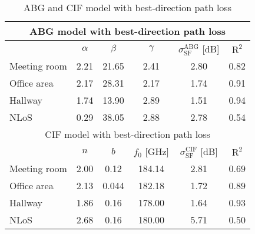 \documentclass[conference]{IEEEtran}
\begin{document}
\begin{table}[htbp]
  \centering
  \caption{ABG and CIF model with best-direction path loss}
    \begin{tabular}{|l|c|c|c|c|c|}
    \hline
    \multicolumn{6}{|c|}{ABG model with best-direction path loss}  \\
    \hline
          & \multicolumn{1}{c|}{$\alpha$} & \multicolumn{1}{c|}{$\beta$} & \multicolumn{1}{c|}{$\gamma$} & \multicolumn{1}{c|}{$\sigma_{\text{SF}}^{\text{ABG}}$ [dB]} & \multicolumn{1}{c|}{$\text{R}^2$}  \\
    \hline
    Meeting room & 2.21  & 21.65 & 2.41  & 2.80  & 0.82  \\
    \hline
    Office area & 2.17  & 28.31 & 2.17  & 1.74  & 0.91  \\
    \hline
    Hallway & 1.74  & 13.90 & 2.89  & 1.51  & 0.94  \\
    \hline
    NLoS  & 0.29  & 38.05 & 2.88  & 2.78  & 0.54  \\
    \hline
    \multicolumn{6}{|c|}{CIF model with best-direction path loss}  \\
    \hline
          & \multicolumn{1}{c|}{$n$} & \multicolumn{1}{c|}{$b$} & \multicolumn{1}{c|}{$f_0$ [GHz]} & \multicolumn{1}{c|}{$\sigma_{\text{SF}}^{\text{CIF}}$ [dB]} & \multicolumn{1}{c|}{$\text{R}^2$}  \\
    \hline
    Meeting room & 2.00  & 0.12  & 184.14 & 2.81  & 0.69  \\
    \hline
    Office area & 2.13  & 0.044 & 182.18 & 1.72  & 0.89  \\
    \hline
    Hallway & 1.86  & 0.16  & 178.00 & 1.64  & 0.93  \\
    \hline
    NLoS  & 2.68  & 0.16  & 180.00 & 5.71  & 0.50  \\
    \hline
    \end{tabular}%
  \label{tab:MF-best}%
\end{table}%
\end{document}
